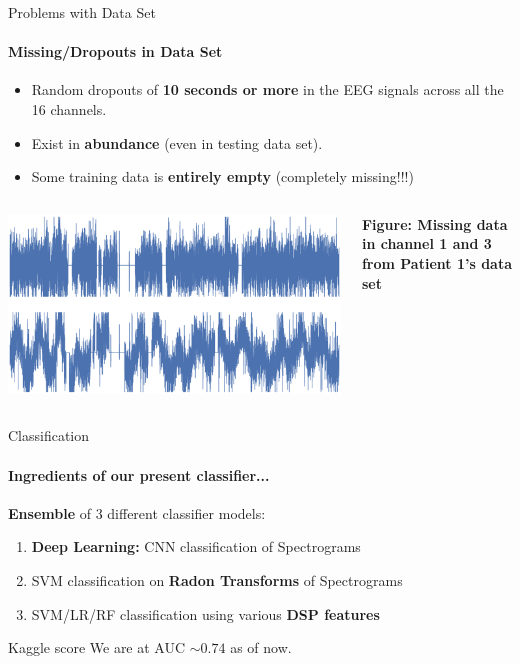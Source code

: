 \documentclass{beamer}
\begin{document}
\begin{frame}{Problems with Data Set}
  \framesubtitle{Missing/Dropouts in Data Set}

  \begin{block}{}
    \begin{itemize}
    \item Random dropouts of \textbf{10 seconds or more} in the EEG signals across all the 16 channels.
    \item Exist in \textbf{abundance} (even in testing data set).
    \item Some training data is \textbf{entirely empty} (completely missing!!!)
    \end{itemize}
  \end{block}

  \begin{columns}
    \includegraphics[scale=0.13]{img/data_drops2.eps}

    \textbf{Figure: Missing data in channel 1 and 3 from Patient 1's data set}
  \end{columns}
\end{frame}

\begin{frame}{Classification}
  \framesubtitle{Ingredients of our present classifier...}

  \textbf{Ensemble} of 3 different classifier models:
  
  \begin{enumerate}
  \item \textbf{Deep Learning:} CNN classification of Spectrograms
  \item SVM classification on \textbf{Radon Transforms} of Spectrograms
  \item SVM/LR/RF  classification using various \textbf{DSP features}
  \end{enumerate}

  \pause
  \begin{block}{Kaggle score}
    We are at AUC $\boldsymbol{\sim 0.74}$ as of now.
  \end{block}
\end{frame}
\end{document}
